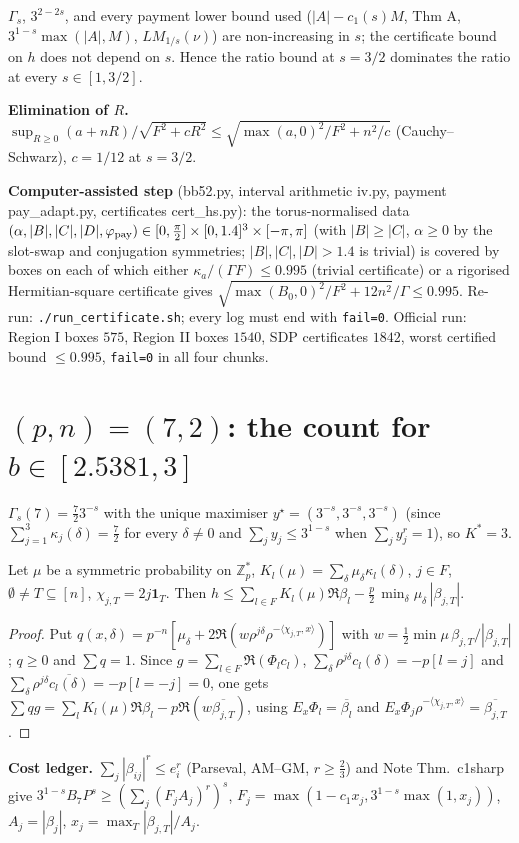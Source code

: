 \documentclass[11pt]{article}
\begin{document}
\begin{lemma}[$s$-monotonicity]  $\Gamma_s$, $3^{2-2s}$, and every payment lower bound used ($|A|-c_1(s)M$, Thm A, $3^{1-s}\max(|A|,M)$, $L M_{1/s}(\nu)$) are non-increasing in $s$;
the certificate bound on $h$ does not depend on $s$.  Hence the ratio bound at $s=3/2$ dominates the ratio at every $s\in[1,3/2]$.\end{lemma}

\textbf{Elimination of $R$.}  $\sup_{R\ge0}(a+nR)/\sqrt{F^2+cR^2}\le\sqrt{\max(a,0)^2/F^2+n^2/c}$ (Cauchy--Schwarz), $c=1/12$ at $s=3/2$.

\textbf{Computer-assisted step} (bb52.py, interval arithmetic iv.py, payment pay\_adapt.py, certificates cert\_hs.py): the torus-normalised data
$(\alpha,|B|,|C|,|D|,\varphi_{\rm pay})\in[0,\tfrac\pi2]\times[0,1.4]^3\times[-\pi,\pi]$ (with $|B|\ge|C|$, $\alpha\ge0$ by the slot-swap and conjugation symmetries;
$|B|,|C|,|D|>1.4$ is trivial) is covered by boxes on each of which either $\kappa_a/(\Gamma F)\le0.995$ (trivial certificate) or a rigorised Hermitian-square
certificate gives $\sqrt{\max(B_0,0)^2/F^2+12n^2}/\Gamma\le0.995$.  Re-run: \texttt{./run\_certificate.sh}; every log must end with \texttt{fail=0}.
Official run: Region I boxes $575$, Region II boxes $1540$, SDP certificates $1842$, worst certified bound $\le0.995$, \texttt{fail=0} in all four chunks.

\section*{$(p,n)=(7,2)$: the count for $b\in[2.5381,3]$}
$\Gamma_s(7)=\tfrac72 3^{-s}$ with the unique maximiser $y^\star=(3^{-s},3^{-s},3^{-s})$ (since $\sum_{j=1}^3\kappa_j(\delta)=\tfrac72$ for every $\delta\ne0$ and
$\sum_jy_j\le3^{1-s}$ when $\sum_jy_j^r=1$), so $K^\ast=3$.

\begin{lemma}
Let $\mu$ be a symmetric probability on $\mathbb Z_p^\ast$, $K_l(\mu)=\sum_\delta\mu_\delta\kappa_l(\delta)$, $j\in F$, $\emptyset\ne T\subseteq[n]$, $\chi_{j,T}=2j\mathbf 1_T$.
Then $h\le\sum_{l\in F}K_l(\mu)\Re\beta_l-\tfrac p2\,\min_\delta\mu_\delta\,|\beta_{j,T}|$.
\end{lemma}
\begin{proof}
Put $q(x,\delta)=p^{-n}[\mu_\delta+2\Re(w\rho^{j\delta}\rho^{-\langle\chi_{j,T},x\rangle})]$ with $w=\tfrac12\min\mu\,\beta_{j,T}/|\beta_{j,T}|$; $q\ge0$ and $\sum q=1$.
Since $g=\sum_{l\in F}\Re(\Phi_lc_l)$, $\sum_{\delta}\rho^{j\delta}c_l(\delta)=-p[l=j]$ and $\sum_\delta\rho^{j\delta}\overline{c_l(\delta)}=-p[l=-j]=0$, one gets
$\sum q g=\sum_lK_l(\mu)\Re\beta_l-p\Re(w\overline{\beta_{j,T}})$, using $E_x\Phi_l=\overline{\beta_l}$ and $E_x\Phi_j\rho^{-\langle\chi_{j,T},x\rangle}=\overline{\beta_{j,T}}$.
\end{proof}
\textbf{Cost ledger.} $\sum_j|\beta_{ij}|^r\le e_i^r$ (Parseval, AM--GM, $r\ge\frac23$) and Note Thm.~c1sharp give
$3^{1-s}B_7P^s\ge(\sum_j(F_jA_j)^r)^s$, $F_j=\max(1-c_1x_j,3^{1-s}\max(1,x_j))$, $A_j=|\beta_j|$, $x_j=\max_T|\beta_{j,T}|/A_j$.
\end{document}
